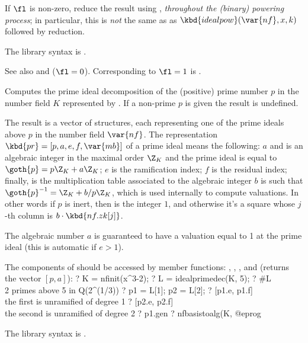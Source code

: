 If $\fl$ is non-zero, reduce the result using , \emph{throughout
the (binary) powering process}; in particular, this is \emph{not} the same as
as $\kbd{idealpow}(\var{nf},x,k)$ followed by reduction.

The library syntax is .

\noindent See also
 and
 ($\fl = 0$).
Corresponding to $\fl=1$ is .

\label{se:idealprimedec}
Computes the prime ideal
decomposition of the (positive) prime number $p$ in the number field $K$
represented by . If a non-prime $p$ is given the result is undefined.

The result is a vector of  structures, each representing one of the
prime ideals above $p$ in the number field $\var{nf}$. The representation
$\kbd{pr}=[p,a,e,f,\var{mb}]$ of a prime ideal means the following: $a$ and
is an algebraic integer in the maximal order $\Z_K$ and the prime ideal is
equal to $\goth{p} = p\Z_K + a\Z_K$;
$e$ is the ramification index; $f$ is the residual index;
finally,  is the multiplication table associated to the algebraic
integer $b$ is such that $\goth{p}^{-1}=\Z_K+ b/ p\Z_K$, which is used
internally to compute valuations. In other words if $p$ is inert,
then  is the integer $1$, and otherwise it's a square 
whose $j$-th column is $b \cdot \kbd{nf.zk[j]}$.

The algebraic number $a$ is guaranteed to have a
valuation equal to 1 at the prime ideal (this is automatic if $e>1$).

The components of  should be accessed by member functions: ,
, , and  (returns the vector $[p,a]$):
\bprog
? K = nfinit(x^3-2);
? L = idealprimedec(K, 5);
? #L       \\ 2 primes above 5 in Q(2^(1/3))
? p1 = L[1]; p2 = L[2];
? [p1.e, p1.f]    \\ the first is unramified of degree 1
? [p2.e, p2.f]    \\ the second is unramified of degree 2
? p1.gen
? nfbasistoalg(K, %
@eprog

The library syntax is .

